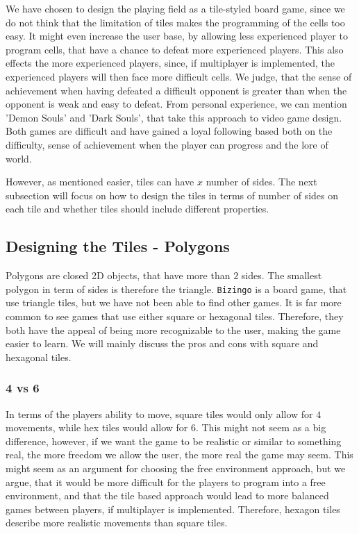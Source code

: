 We have chosen to design the playing field as a tile-styled board game, since we do not think that the limitation of tiles makes the programming of the cells too easy.
It might even increase the user base, by allowing less experienced player to program cells, that have a chance to defeat more experienced players.
This also effects the more experienced players, since, if multiplayer is implemented, the experienced players will then face more difficult cells.
We judge, that the sense of achievement when having defeated a difficult opponent is greater than when the opponent is weak and easy to defeat.
From personal experience, we can mention 'Demon Souls' and 'Dark Souls', that take this approach to video game design.
Both games are difficult and have gained a loyal following based both on the difficulty, sense of achievement when the player can progress and the lore of world.\newline

However, as mentioned easier, tiles can have $x$ number of sides. The next subsection will focus on how to design the tiles in terms of number of sides on each tile and whether tiles should include different properties.

\subsection{Designing the Tiles - Polygons}
Polygons are closed 2D objects, that have more than $2$ sides.
The smallest polygon in term of sides is therefore the triangle.
\texttt{Bizingo} is a board game, that use triangle tiles, but we have not been able to find other games.
It is far more common to see games that use either square or hexagonal tiles.
Therefore, they both have the appeal of being more recognizable to the user, making the game easier to learn.
We will mainly discuss the pros and cons with square and hexagonal tiles.

\subsubsection{4 vs 6}
In terms of the players ability to move, square tiles would only allow for $4$ movements, while hex tiles would allow for $6$.
This might not seem as a big difference, however, if we want the game to be realistic or similar to something real, the more freedom we allow the user, the more real the game may seem.
This might seem as an argument for choosing the free environment approach, but we argue, that it would be more difficult for the players to program into a free environment, and that the tile based approach would lead to more balanced games between players, if multiplayer is implemented.
Therefore, hexagon tiles describe more realistic movements than square tiles.\newline

